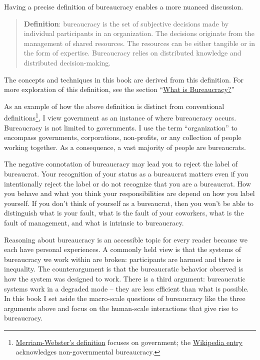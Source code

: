 Having a precise definition of bureaucracy enables a more nuanced discussion. 
\begin{quote}
\textbf{Definition}: \Gls{bureaucracy} is the set of subjective decisions made by individual participants in an organization. The decisions originate from the management of shared resources. The resources can be either tangible or in the form of expertise. Bureaucracy relies on distributed knowledge and distributed decision-making. 
\end{quote}

The concepts and techniques in this book are derived from this definition. For more exploration of this definition, see the section ``\hyperref[sec:define-bureaucracy]{What is Bureaucracy?}''

As an example of how the above definition is distinct from conventional definitions\footnote{\href{https://www.merriam-webster.com/dictionary/bureaucracy}{Merriam-Webster's definition} focuses on government; the \href{https://en.wikipedia.org/wiki/Bureaucracy}{Wikipedia entry}
acknowledges non-governmental bureaucracy.}, I view government as an instance of where bureaucracy occurs. Bureaucracy is not limited to governments. I use the term ``organization'' to encompass governments, corporations, non-profits, or any collection of people working together. As a consequence, a vast majority of people are bureaucrats. 

The negative connotation of bureaucracy may lead you to reject the label of bureaucrat. Your recognition of your status as a bureaucrat matters even if you intentionally reject the label or do not recognize that you are a bureaucrat. How you behave and what you think your responsibilities are depend on how you label yourself.
If you don't think of yourself as a bureaucrat, then you won't be able to distinguish what is your fault, what is the fault of your coworkers, what is the fault of management, and what is intrinsic to bureaucracy. 

Reasoning about bureaucracy is an accessible topic for every reader because we each have personal experiences.
A commonly held view is that the systems of bureaucracy we work within are broken: participants are harmed and there is inequality. 
The counterargument is that the bureaucratic behavior observed is how the system was designed to work. There is a third argument: bureaucratic systems work in a degraded mode -- they are less efficient than what is possible. 
In this book I set aside the macro-scale questions of bureaucracy like the three arguments above and focus on the human-scale interactions that give rise to bureaucracy.

